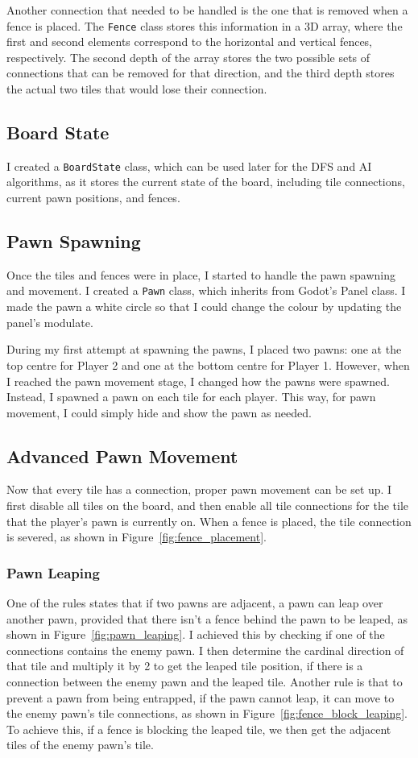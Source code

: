 \documentclass[progress]{cmpreport}
\begin{document}
Another connection that needed to be handled is the one that is removed when a fence is placed. The \texttt{Fence} class stores this information in a 3D array, where the first and second elements correspond to the horizontal and vertical fences, respectively. The second depth of the array stores the two possible sets of connections that can be removed for that direction, and the third depth stores the actual two tiles that would lose their connection.  

\subsection{Board State}
I created a \texttt{BoardState} class, which can be used later for the DFS and AI algorithms, as it stores the current state of the board, including tile connections, current pawn positions, and fences.

\subsection{Pawn Spawning}
Once the tiles and fences were in place, I started to handle the pawn spawning and movement. I created a \texttt{Pawn} class, which inherits from Godot's Panel class. I made the pawn a white circle so that I could change the colour by updating the panel's modulate.  

\noindent During my first attempt at spawning the pawns, I placed two pawns: one at the top centre for Player 2 and one at the bottom centre for Player 1. However, when I reached the pawn movement stage, I changed how the pawns were spawned. Instead, I spawned a pawn on each tile for each player. This way, for pawn movement, I could simply hide and show the pawn as needed.

\subsection{Advanced Pawn Movement}
Now that every tile has a connection, proper pawn movement can be set up. I first disable all tiles on the board, and then enable all tile connections for the tile that the player's pawn is currently on. When a fence is placed, the tile connection is severed, as shown in Figure~\ref{fig:fence_placement}.

\subsubsection{Pawn Leaping}
One of the rules states that if two pawns are adjacent, a pawn can leap over another pawn, provided that there isn't a fence behind the pawn to be leaped, as shown in Figure~\ref{fig:pawn_leaping}. I achieved this by checking if one of the connections contains the enemy pawn. I then determine the cardinal direction of that tile and multiply it by 2 to get the leaped tile position, if there is a connection between the enemy pawn and the leaped tile. Another rule is that to prevent a pawn from being entrapped, if the pawn cannot leap, it can move to the enemy pawn's tile connections, as shown in Figure~\ref{fig:fence_block_leaping}. To achieve this, if a fence is blocking the leaped tile, we then get the adjacent tiles of the enemy pawn's tile.
\end{document}
